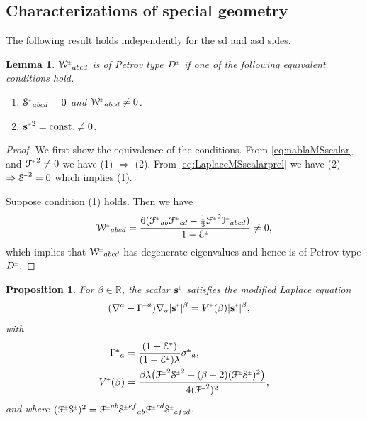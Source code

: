 \documentclass[a4paper,10pt,reqno]{amsart}
\newcommand{\Reals}{\mathbb{R}}
\newcommand{\Scal}{\mathop{\rm Scal}}
\theoremstyle{plain}
\newtheorem{lemma}[thm]{Lemma}
\newtheorem{prop}[thm]{Proposition}
\newcommand{\PM}[1]{{{#1}^{\hspace{-.5pt}\scaleto{\pm}{3.5pt}}}}
\newcommand{\MP}[1]{{{#1}^{\hspace{-.5pt}\scaleto{\mp}{3.5pt}}}}
\def\Wcal{\mathcal{W}}
\def\Fcal{\mathcal{F}}
\def\Ecal{\mathcal{E}}
\def\Scal{\mathcal{S}}
\def\Ical{\mathcal{I}}
\def\sbold{\mathbf{s}}
\numberwithin{equation}{section}
\begin{document}
\subsection{Characterizations of special geometry} 
The following result holds independently for the sd and asd sides. 
\begin{lemma} \label{lem:typeDchar}
$\PM{\Wcal}_{abcd} $ is of Petrov type $\PM{D}$ if one of the following equivalent conditions hold.
\begin{enumerate}
\item $\PM{\Scal}_{abcd} = 0$ and $\PM{\Wcal}_{abcd} \neq 0$.
\item $\PM{\sbold}^2 = \text{const.} \neq 0$.
\end{enumerate}
\end{lemma}
\begin{proof}
We first show the equivalence of the conditions. From \eqref{eq:nablaMSscalar} and $\PM{\Fcal}^2 \neq0$ we have (1) $\Rightarrow$ (2). From \eqref{eq:LaplaceMSscalarprel} we have (2) $\Rightarrow \PM{\Scal}^2 = 0$ which implies (1).

Suppose condition (1) holds. Then we have
\begin{align}
\PM{\Wcal}_{abcd} = \frac{6 (\PM{\Fcal}_{ab} \PM{\Fcal}_{cd} -  \tfrac{1}{3} \PM{\Fcal}^2 \PM{\Ical}_{abcd})}{1 -  \PM{\Ecal}} \neq 0, 
\end{align}
which implies that $\PM{\Wcal}_{abcd}$ has degenerate eigenvalues and hence is of Petrov type $\PM{D}$.
\end{proof}

%

\begin{prop} \label{prop:MS} 
For  $\beta \in \Reals$, the scalar $\PM{\sbold}$ satisfies the modified Laplace equation
\begin{align} \label{eq:LaplaceMSscalar}
(\nabla^{a} - \PM{\Gamma}^{a}) \nabla_{a} |\PM{\sbold}|^\beta ={}& \PM{V}(\beta) |\PM{\sbold}|^\beta,
\end{align}
with  
\begin{align}
\PM{\Gamma}_{a}={}&\frac{(1 + \MP{\Ecal}) }{(1 -  \PM{\Ecal}) \lambda} \PM{\sigma}_{a}, \label{eq:Gammapm}\\
\PM{V}(\beta) ={}& \frac{\beta \lambda \bigl(\PM{\Fcal}^2 \PM{\Scal}^2 + (\beta - 2) (\PM{\Fcal}\PM{\Scal})^2 \bigr) }{4 (\PM{\Fcal}^2)^2}, \label{eq:Vpm}
\end{align}
and where $(\PM{\Fcal}\PM{\Scal})^2 = \PM{\Fcal}^{ab} \PM{\Scal}^{ef}{}_{ab} \PM{\Fcal}^{cd} \PM{\Scal}_{efcd} $.
\end{prop}
\end{document}
